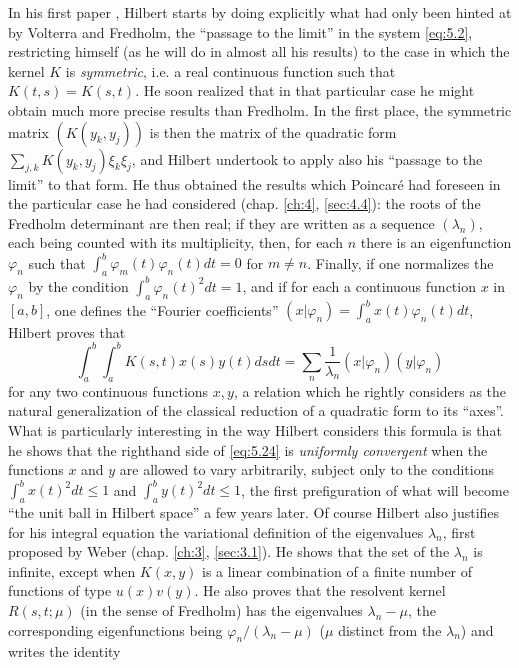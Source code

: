 \documentclass[12pt,a4paper,leqno,twoside]{extbook}
\begin{document}
In his first paper \cite[p.~1--38]{112}, Hilbert starts by doing explicitly what had only been hinted at by Volterra and Fredholm, the ``passage to the limit'' in the system \eqref{eq:5.2}, restricting himself (as he will do in almost all his results) to the case in which the kernel \(K\) is \emph{symmetric}, i.e. a real continuous function such that \(K(t,s) = K(s,t)\). He soon realized that in that particular case he might obtain much more precise results than Fredholm. In the first place, the symmetric matrix \((K(y_k,y_j))\) is then the matrix of the quadratic form \(\sum\limits_{j,k} K(y_k, y_j) \xi_k \xi_j\), and Hilbert undertook to apply also his ``passage to the limit'' to that form. He thus obtained the results which Poincaré had foreseen in the particular case he had considered (chap. \ref{ch:4}, \ref{sec:4.4}): the roots of the Fredholm determinant are then real; if they are written as a sequence \((\lambda_n)\), each being counted with its multiplicity, then, for each \(n\) there is an eigenfunction \(\varphi_n\) such that \(\int_a^b \varphi_m(t) \varphi_n(t)dt = 0\) for \(m \neq n\). Finally, if one normalizes the \(\varphi_n\) by the condition \(\int_a^b \varphi_n(t)^2 dt = 1\), and if for each a continuous function \(x\) in \([a,b]\), one defines the ``Fourier coefficients'' \((x|\varphi_n) = \int_a^b x(t)\varphi_n(t)dt\), Hilbert proves that
\begin{equation}
    \label{eq:5.24}
    \int_a^b \int_a^b K(s,t)x(s)y(t)dsdt = \sum_n \frac{1}{\lambda_n} (x|\varphi_n)(y|\varphi_n)
\end{equation}
for any two continuous functions \(x, y\), a relation which he rightly considers as the natural generalization of the classical reduction of a quadratic form to its ``axes''. What is particularly interesting in the way Hilbert considers this formula is that he shows that the righthand side of \eqref{eq:5.24} is \emph{uniformly convergent} when the functions \(x\) and \(y\) are allowed to vary arbitrarily, subject only to the conditions \(\int_a^b x(t)^2dt \leq 1\) and \(\int_a^b y(t)^2dt \leq 1\), the first prefiguration of what will become ``the unit ball in Hilbert space'' a few years later. Of course Hilbert also justifies for his integral equation the variational definition of the eigenvalues \(\lambda_n\), first proposed by Weber (chap. \ref{ch:3}, \ref{sec:3.1}). He shows that the set of the \(\lambda_n\) is infinite, except when \(K(x,y)\) is a linear combination of a finite number of functions of type \(u(x)v(y)\). He also proves that the resolvent kernel \(R(s,t; \mu)\) (in the sense of Fredholm) has the eigenvalues \(\lambda_n - \mu\), the corresponding eigenfunctions being \(\varphi_n/(\lambda_n - \mu)\) (\(\mu\) distinct from the \(\lambda_n\)) and writes the identity
\end{document}
